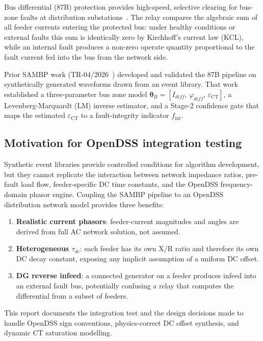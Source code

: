 \documentclass[12pt,a4paper]{article}
\newcommand{\thetaB}{\boldsymbol{\theta}_B}
\newcommand{\fint}{f_{\mathrm{int}}}
\newcommand{\eCT}{\varepsilon_{\mathrm{CT}}}
\begin{document}
Bus differential (87B) protection provides high-speed, selective clearing for
bus-zone faults at distribution substations~\citep{Blackburn2006,Anderson1999}.
The relay compares the algebraic sum of all feeder currents entering the
protected bus: under healthy conditions or external faults this sum is
identically zero by Kirchhoff's current law (KCL), while an internal fault
produces a non-zero operate quantity proportional to the fault current fed into
the bus from the network side.

Prior SAMBP work (TR-04/2026~\citep{SAMBP_TR04}) developed and validated the
87B pipeline on synthetically generated waveforms drawn from an event library.
That work established a three-parameter bus zone model
$\thetaB = [I_{diff},\,\varphi_{diff},\,\eCT]$, a Levenberg-Marquardt (LM)
inverse estimator, and a Stage-2 confidence gate that maps the estimated
$\eCT$ to a fault-integrity indicator $\fint$.

\subsection*{Motivation for OpenDSS integration testing}

Synthetic event libraries provide controlled conditions for algorithm
development, but they cannot replicate the interaction between network impedance
ratios, pre-fault load flow, feeder-specific DC time constants, and the
OpenDSS frequency-domain phasor engine.  Coupling the SAMBP pipeline to an
OpenDSS distribution network model provides three benefits:

\begin{enumerate}
  \item \textbf{Realistic current phasors}: feeder-current magnitudes and
    angles are derived from full AC network solution, not assumed.
  \item \textbf{Heterogeneous $\tau_{dc}$}: each feeder has its own X/R ratio
    and therefore its own DC decay constant, exposing any implicit assumption
    of a uniform DC offset.
  \item \textbf{DG reverse infeed}: a connected generator on a feeder produces
    infeed into an external fault bus, potentially confusing a relay that
    computes the differential from a subset of feeders.
\end{enumerate}

This report documents the integration test and the design decisions made to
handle OpenDSS sign conventions, physics-correct DC offset synthesis, and
dynamic CT saturation modelling.
\end{document}
